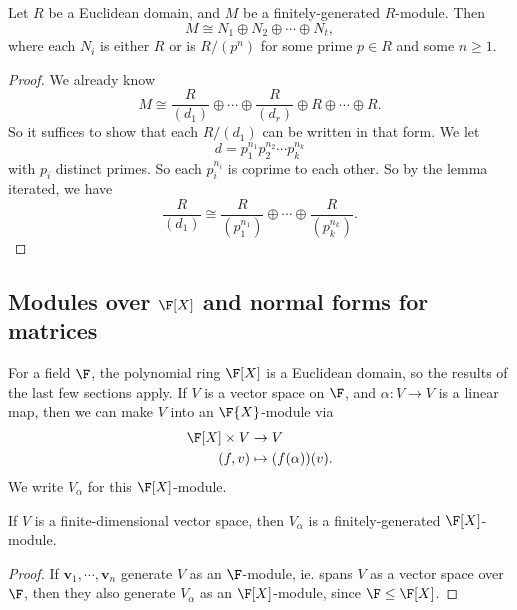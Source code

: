 \documentclass[a4paper]{article}
\begin{document}
\begin{thm}
  Let $R$ be a Euclidean domain, and $M$ be a finitely-generated $R$-module. Then
  \[
    M \cong N_1 \oplus N_2 \oplus \cdots \oplus N_t,
  \]
  where each $N_i$ is either $R$ or is $R/(p^n)$ for some prime $p \in R$ and some $n \geq 1$.
\end{thm}

\begin{proof}
  We already know
  \[
    M \cong \frac{R}{(d_1)} \oplus \cdots \oplus \frac{R}{(d_r)} \oplus R \oplus \cdots \oplus R.
  \]
  So it suffices to show that each $R/(d_1)$ can be written in that form. We let
  \[
    d = p_1^{n_1} p_2^{n_2} \cdots p_k^{n_k}
  \]
  with $p_i$ distinct primes. So each $p_i^{n_i}$ is coprime to each other. So by the lemma iterated, we have
  \[
    \frac{R}{(d_1)} \cong \frac{R}{(p_1^{n_1})} \oplus\cdots \oplus \frac{R}{(p_k^{n_k})}.
  \]
\end{proof}

\subsection{Modules over \texorpdfstring{$\F[X]$}{F[X]} and normal forms for matrices}
For a field $\F$, the polynomial ring $\F[X]$ is a Euclidean domain, so the results of the last few sections apply. If $V$ is a vector space on $\F$, and $\alpha: V \to V$ is a linear map, then we can make $V$ into an $\F{X}$-module via
\begin{align*}
  \F[X] \times V &\to V\\
  (f, v) &\mapsto (f(\alpha))(v).
\end{align*}
We write $V_\alpha$ for this $\F[X]$-module.

\begin{lemma}
  If $V$ is a finite-dimensional vector space, then $V_\alpha$ is a finitely-generated $\F[X]$-module.
\end{lemma}

\begin{proof}
  If $\mathbf{v}_1, \cdots, \mathbf{v}_n$ generate $V$ as an $\F$-module, ie. spans $V$ as a vector space over $\F$, then they also generate $V_\alpha$ as an $\F[X]$-module, since $\F \leq \F[X]$.
\end{proof}
\end{document}
